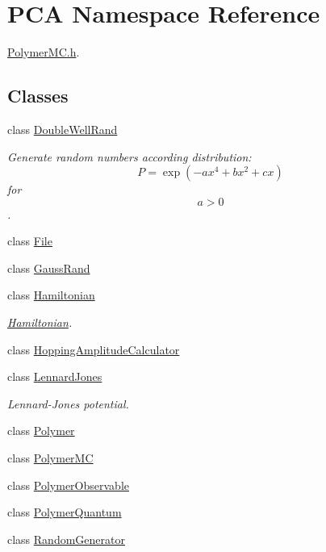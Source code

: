 \hypertarget{namespace_p_c_a}{}\section{P\+CA Namespace Reference}
\label{namespace_p_c_a}


\hyperlink{_polymer_m_c_8h}{Polymer\+M\+C.\+h}.  


\subsection*{Classes}
\begin{DoxyCompactItemize}
\item 
class \hyperlink{class_p_c_a_1_1_double_well_rand}{Double\+Well\+Rand}
\begin{DoxyCompactList}\small\item\em Generate random numbers according distribution\+: \[ P = \exp(-ax^4+bx^2+cx) \] for \[ a>0 \]. \end{DoxyCompactList}\item 
class \hyperlink{class_p_c_a_1_1_file}{File}
\item 
class \hyperlink{class_p_c_a_1_1_gauss_rand}{Gauss\+Rand}
\item 
class \hyperlink{class_p_c_a_1_1_hamiltonian}{Hamiltonian}
\begin{DoxyCompactList}\small\item\em \hyperlink{class_p_c_a_1_1_hamiltonian}{Hamiltonian}. \end{DoxyCompactList}\item 
class \hyperlink{class_p_c_a_1_1_hopping_amplitude_calculator}{Hopping\+Amplitude\+Calculator}
\item 
class \hyperlink{class_p_c_a_1_1_lennard_jones}{Lennard\+Jones}
\begin{DoxyCompactList}\small\item\em Lennard-\/\+Jones potential. \end{DoxyCompactList}\item 
class \hyperlink{class_p_c_a_1_1_polymer}{Polymer}
\item 
class \hyperlink{class_p_c_a_1_1_polymer_m_c}{Polymer\+MC}
\item 
class \hyperlink{class_p_c_a_1_1_polymer_observable}{Polymer\+Observable}
\item 
class \hyperlink{class_p_c_a_1_1_polymer_quantum}{Polymer\+Quantum}
\item 
class \hyperlink{class_p_c_a_1_1_random_generator}{Random\+Generator}

\end{DoxyCompactItemize}
